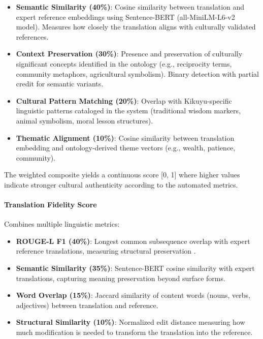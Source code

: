 \begin{itemize}
    \item \textbf{Semantic Similarity (40\%)}: Cosine similarity between translation and expert reference embeddings using Sentence-BERT \cite{reimers2019sentence} (all-MiniLM-L6-v2 model). Measures how closely the translation aligns with culturally validated references.
    
    \item \textbf{Context Preservation (30\%)}: Presence and preservation of culturally significant concepts identified in the ontology (e.g., reciprocity terms, community metaphors, agricultural symbolism). Binary detection with partial credit for semantic variants.
    
    \item \textbf{Cultural Pattern Matching (20\%)}: Overlap with Kikuyu-specific linguistic patterns cataloged in the system (traditional wisdom markers, animal symbolism, moral lesson structures).
    
    \item \textbf{Thematic Alignment (10\%)}: Cosine similarity between translation embedding and ontology-derived theme vectors (e.g., wealth, patience, community).
\end{itemize}

The weighted composite yields a continuous score [0, 1] where higher values indicate stronger cultural authenticity according to the automated metrics.

\paragraph{Translation Fidelity Score}
Combines multiple linguistic metrics:

\begin{itemize}
    \item \textbf{ROUGE-L F1 (40\%)}: Longest common subsequence overlap with expert reference translations, measuring structural preservation \cite{mathur2020tangled}.
    
    \item \textbf{Semantic Similarity (35\%)}: Sentence-BERT cosine similarity with expert translations, capturing meaning preservation beyond surface forms.
    
    \item \textbf{Word Overlap (15\%)}: Jaccard similarity of content words (nouns, verbs, adjectives) between translation and reference.
    
    \item \textbf{Structural Similarity (10\%)}: Normalized edit distance measuring how much modification is needed to transform the translation into the reference.
\end{itemize}

